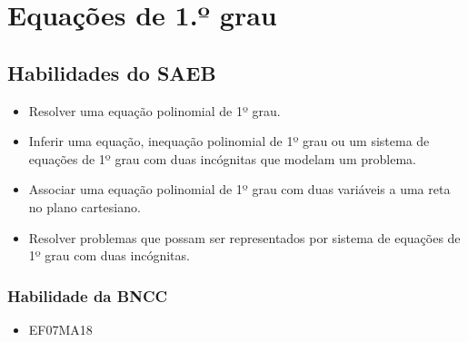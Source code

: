 
\chapter{Equações de 1.º grau}

\section*{Habilidades do SAEB }
\begin{itemize}
\item Resolver uma equação polinomial de 1º grau.
\item
  Inferir uma equação, inequação polinomial de 1º grau ou um sistema de
  equações de 1º grau com duas incógnitas que modelam um problema.
\item
  Associar uma equação polinomial de 1º grau com duas variáveis a uma
  reta no plano cartesiano.
\item
  Resolver problemas que possam ser representados por sistema de
  equações de 1º grau com duas incógnitas.
\end{itemize}

\subsection{Habilidade da BNCC}
\begin{itemize}
\item EF07MA18
\end{itemize}



